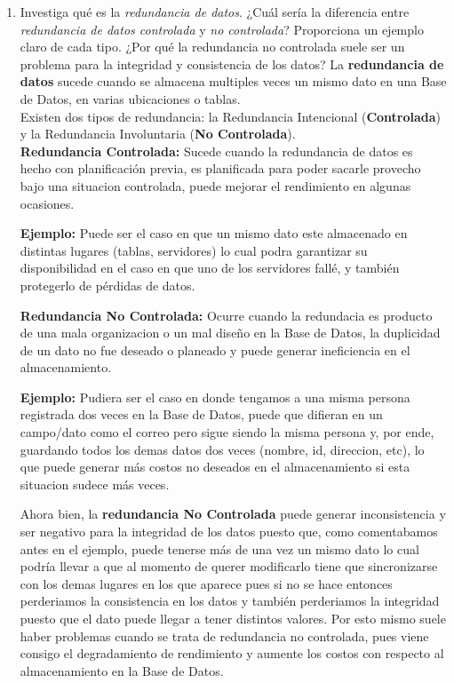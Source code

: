 \documentclass[12pt]{report}
\begin{document}
\begin{enumerate}[label=\textbf{\arabic*.}, leftmargin=*]
\begin{enumerate}[label=\textbf{\alph*.}, leftmargin=*, itemsep=1.0em]
\item Investiga qu\'e es la \textit{redundancia de datos}. ¿Cu\'al ser\'ia la diferencia entre \textit{redundancia de datos controlada} y \textit{no controlada}? Proporciona un ejemplo claro de cada tipo. ¿Por qu\'e la redundancia no controlada suele ser un problema para la integridad y consistencia de los datos?
La \textbf{redundancia de datos} sucede cuando se almacena multiples veces un mismo dato en una Base de Datos, en varias ubicaciones o tablas.\\
Existen dos tipos de redundancia: la Redundancia Intencional (\textbf{Controlada}) y la Redundancia Involuntaria (\textbf{No Controlada}).\\
\textbf{Redundancia Controlada:} Sucede cuando la redundancia de datos es hecho con planificación previa, es planificada para poder sacarle provecho bajo una situacion controlada, puede mejorar el rendimiento en algunas ocasiones.
 
 \hspace{0.3cm}\textbf{Ejemplo:} Puede ser el caso en que un mismo dato este almacenado en distintas lugares (tablas, servidores) lo cual podra garantizar su disponibilidad  en el caso en que uno de los servidores fallé, y también protegerlo de pérdidas de datos.

\textbf{Redundancia No Controlada:} Ocurre cuando la redundacia es producto de una mala organizacion o un mal diseño en la Base de Datos, la duplicidad de un dato no fue deseado o planeado y puede generar ineficiencia en el almacenamiento.

 \hspace{0.3cm}\textbf{Ejemplo:} Pudiera ser el caso en donde tengamos a una misma persona registrada dos veces en la Base de Datos, puede que difieran en un campo/dato como el correo pero sigue siendo la misma persona y, por ende, guardando todos los demas datos dos veces (nombre, id, direccion, etc), lo que puede generar más costos no deseados en el almacenamiento si esta situacion sudece más veces.

 Ahora bien, la \textbf{redundancia No Controlada} puede generar inconsistencia y ser negativo para la integridad de los datos puesto que, como comentabamos antes en el ejemplo, puede tenerse más de una vez un mismo dato lo cual podría llevar a que al momento de querer modificarlo tiene que sincronizarse con los demas lugares en los que aparece pues si no se hace entonces perderiamos la consistencia en los datos y también perderiamos la integridad puesto que el dato puede llegar a tener distintos valores. Por esto mismo suele haber problemas cuando se trata de redundancia no controlada, pues viene consigo el degradamiento de rendimiento y aumente los costos con respecto al almacenamiento en la Base de Datos.



\end{enumerate}
\end{enumerate}
\end{document}
